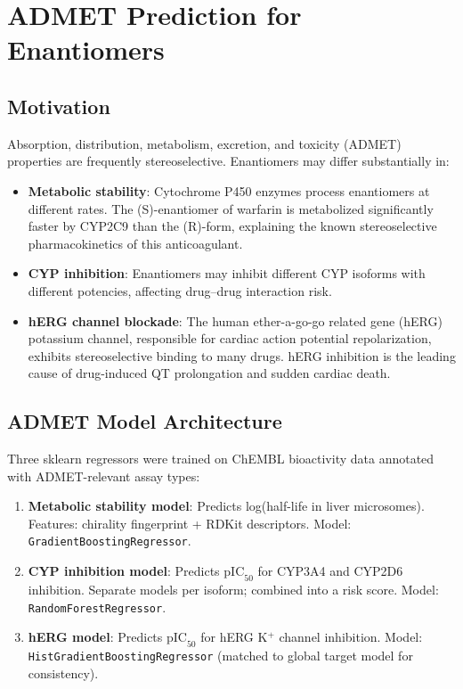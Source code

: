 \documentclass[11pt,a4paper]{article}
\begin{document}
\newpage

\section{ADMET Prediction for Enantiomers}
\label{sec:admet}

\subsection{Motivation}

Absorption, distribution, metabolism, excretion, and toxicity (ADMET) properties
are frequently stereoselective. Enantiomers may differ substantially in:

\begin{itemize}[leftmargin=1.5em]
  \item \textbf{Metabolic stability}: Cytochrome P450 enzymes process enantiomers
    at different rates. The (S)-enantiomer of warfarin is metabolized significantly
    faster by CYP2C9 than the (R)-form, explaining the known stereoselective
    pharmacokinetics of this anticoagulant.
  \item \textbf{CYP inhibition}: Enantiomers may inhibit different CYP isoforms
    with different potencies, affecting drug--drug interaction risk.
  \item \textbf{hERG channel blockade}: The human ether-a-go-go related gene
    (hERG) potassium channel, responsible for cardiac action potential repolarization,
    exhibits stereoselective binding to many drugs. hERG inhibition is the leading
    cause of drug-induced QT prolongation and sudden cardiac death.
\end{itemize}

\subsection{ADMET Model Architecture}

Three sklearn regressors were trained on ChEMBL bioactivity data annotated with
ADMET-relevant assay types:

\begin{enumerate}[leftmargin=1.5em]
  \item \textbf{Metabolic stability model}: Predicts log(half-life in liver
    microsomes). Features: chirality fingerprint + RDKit descriptors. Model:
    \texttt{GradientBoostingRegressor}.
  \item \textbf{CYP inhibition model}: Predicts $\text{pIC}_{50}$ for CYP3A4
    and CYP2D6 inhibition. Separate models per isoform; combined into a risk
    score. Model: \texttt{RandomForestRegressor}.
  \item \textbf{hERG model}: Predicts $\text{pIC}_{50}$ for hERG K$^+$ channel
    inhibition. Model: \texttt{HistGradientBoostingRegressor} (matched to global
    target model for consistency).
\end{enumerate}
\end{document}
